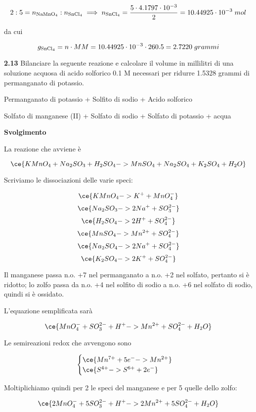 $$2:5=n_{\rm NaMnO_4}:n_{\rm SnCl_4}
\implies
n_{\rm SnCl_4}=\frac{5 \cdot 4.1797 \cdot 10^{-3}}{2}
=10.44925 \cdot 10^{-3}\;mol$$

da cui

$$g_{\rm SnCl_4}=n \cdot MM=10.44925 \cdot 10^{-3} \cdot 260.5=2.7220\;grammi$$

\vspace{0.2cm}\textbf{2.13} Bilanciare la seguente reazione e calcolare il volume in millilitri di una soluzione acquosa di acido solforico 0.1 M necessari per ridurre 1.5328 grammi di permanganato di potassio.

\begin{center}
    Permanganato di potassio + Solfito di sodio + Acido solforico \ce{->}

    \ce{->} Solfato di manganese (II) + Solfato di sodio + Solfato di potassio + acqua
\end{center}

\vspace{0.2cm}\large\textbf{Svolgimento}\normalsize

\vspace{0.2cm}La reazione che avviene è

$$\ce{KMnO_4 + Na_2SO_3 + H_2SO_4 -> MnSO_4 + Na_2SO_4 + K_2SO_4 + H_2O}$$

Scriviamo le dissociazioni delle varie speci:

$$\ce{KMnO_4 -> K^+ + MnO_4^-}$$
$$\ce{Na_2SO_3 -> 2Na^+ + SO_3^{2-}}$$
$$\ce{H_2SO_4 -> 2H^+ + SO_4^{2-}}$$
$$\ce{MnSO_4 -> Mn^{2+} + SO_4^{2-}}$$
$$\ce{Na_2SO_4 -> 2Na^+ + SO_4^{2-}}$$
$$\ce{K_2SO_4 -> 2K^+ + SO_4^{2-}}$$

Il manganese passa n.o. +7 nel permanganato a n.o. +2 nel solfato, pertanto si è ridotto; lo zolfo passa da n.o. +4 nel solfito di sodio a n.o. +6 nel solfato di sodio, quindi si è ossidato.

L'equazione semplificata sarà

$$\ce{MnO_4^- + SO_3^{2-} + H^+ -> Mn^{2+} + SO_4^{2-} + H_2O}$$

Le semireazioni redox che avvengono sono

$$\begin{cases}
\ce{Mn^{7+} + 5e^- -> Mn^{2+}}\\
\ce{S^{4+} -> S^{6+} + 2e^-}
\end{cases}$$

Moltiplichiamo quindi per 2 le speci del manganese e per 5 quelle dello zolfo:

$$\ce{2MnO_4^- + 5SO_3^{2-} + H^+ -> 2Mn^{2+} + 5SO_4^{2-} + H_2O}$$

